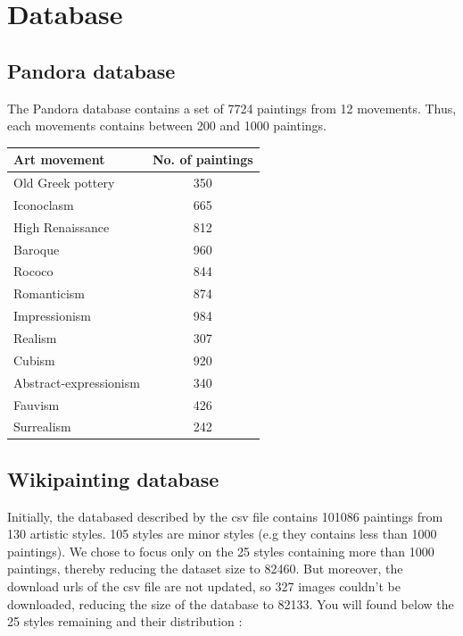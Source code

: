 \newpage
\section{Database}
\subsection{Pandora database}
The Pandora database contains a set of 7724 paintings from 12 movements. Thus, each movements contains
between 200 and 1000 paintings.\\
\begin{tabularx}{8cm}{|X|c|}
	\hline
	\textbf{Art movement} & \textbf{No. of paintings}\\
	\hline
	Old Greek pottery & 350\\
	\hline
	Iconoclasm & 665\\
	\hline
	High Renaissance & 812\\
	\hline
	Baroque & 960\\
	\hline
	Rococo & 844\\
	\hline
	Romanticism & 874\\
	\hline
	Impressionism & 984\\
	\hline
	Realism & 307\\
	\hline
	Cubism & 920\\
	\hline
	Abstract-expressionism & 340\\
	\hline
	Fauvism & 426\\
	\hline
	Surrealism & 242\\
	\hline
\end{tabularx}

\subsection{Wikipainting database}

Initially, the databased described by the csv file contains 101086 paintings from 130 artistic styles. 105 styles are minor styles (e.g they contains less than 1000 paintings). We chose to focus only on the 25 styles containing more than 1000 paintings, thereby reducing the dataset size to 82460. But moreover, the download urls of the csv file are not updated, so 327 images couldn't be downloaded, reducing the size of the database to 82133. You will found below the 25 styles remaining and their distribution :\\

